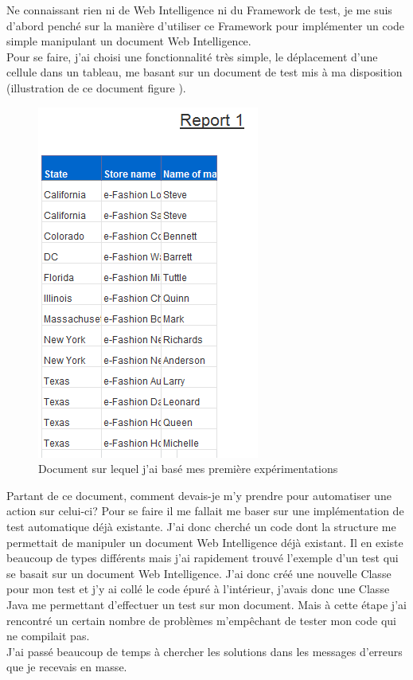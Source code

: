 

Ne connaissant rien ni de Web Intelligence ni du \gls{Framework} de test, je me suis d'abord pench\'{e} sur la mani\`{e}re d'utiliser ce \gls{Framework} pour impl\'{e}menter un code simple manipulant un document Web Intelligence.\\

Pour se faire, j'ai choisi une fonctionnalit\'{e} tr\`{e}s simple, le d\'{e}placement d'une cellule dans un tableau, me basant sur un document de test mis \`{a} ma disposition (illustration de ce document figure \pageref{figure:docsample}).\\

\begin{figure}[!h]
  \centering
      \includegraphics{images/docsample.png}
  \caption{Document sur lequel j'ai bas\'{e} mes premi\`{e}re exp\'{e}rimentations}
	\label{figure:docsample}
\end{figure}
 
Partant de ce document, comment devais-je m'y prendre pour automatiser une action sur celui-ci? Pour se faire il me fallait me baser sur une impl\'{e}mentation de test automatique d\'{e}j\`{a} existante. J'ai donc cherché un code dont la structure me permettait de manipuler un document Web Intelligence d\'{e}j\`{a} existant. Il en existe beaucoup de types diff\'{e}rents mais j'ai rapidement trouv\'{e} l'exemple d'un test qui se basait sur un document Web Intelligence. J'ai donc cr\'{e}\'{e} une nouvelle \gls{Classe} pour mon test et j'y ai coll\'{e} le code \'{e}pur\'{e} \`{a} l'int\'{e}rieur, j'avais donc une \gls{Classe} \gls{Java} me permettant d'effectuer un test sur mon document. Mais \`{a} cette \'{e}tape j'ai rencontr\'{e} un certain nombre de probl\`{e}mes m'emp\^{e}chant de tester mon code qui ne compilait pas.\\
J'ai pass\'{e} beaucoup de temps \`{a} chercher les solutions dans les messages d'erreurs que je recevais en masse.\\

